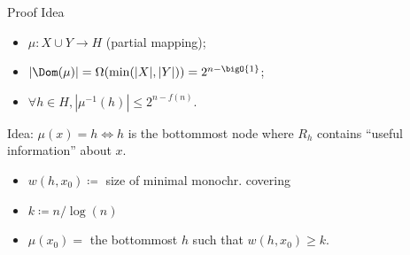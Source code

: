 \begin{frame}{Proof Idea}

    \begin{itemize}
        \item $\mu\colon X \cup Y \to H$ (partial mapping);
        \item $|\Dom(\mu)| = \Omega(\min(|X|, |Y|)) = 2^{n - \bigO{1}}$;
        \item $\forall h \in H, |\mu^{-1}(h)| \le 2^{n - f(n)}$.
    \end{itemize}

    \pause
    Idea: $\mu(x) = h \Leftrightarrow h$ is the bottommost node where $R_h$ contains ``useful
    information'' about $x$.

    \pause

    \begin{minipage}{0.38\linewidth}
        \centering
        
    \end{minipage}
    \begin{minipage}{0.58\linewidth}
        \pause
        \begin{itemize}
            \item $w(h, x_0) \coloneqq$ size of minimal monochr. covering
            \item $k \coloneqq n / \log(n)$
            \item $\mu(x_0) =$ the bottommost $h$ such that $w(h, x_0) \ge k$.
        \end{itemize}
    \end{minipage}

\end{frame}

